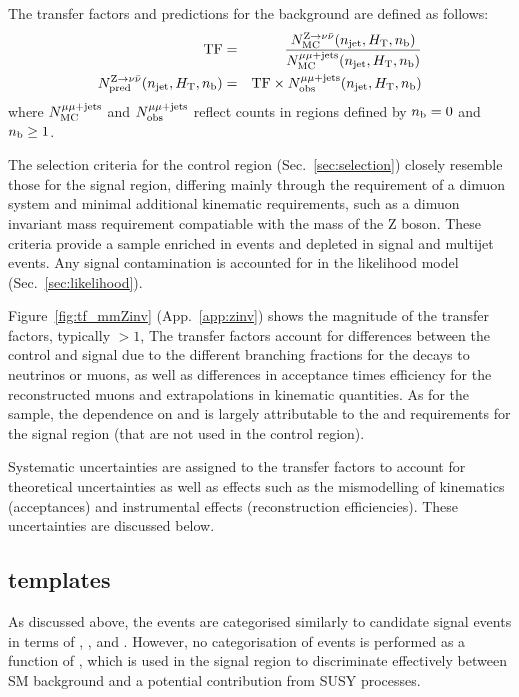 The transfer factors and predictions for the \znunuj background are
defined as follows:
\begin{eqnarray}
  \label{equ:tf-ratio-zinv}
  {\rm TF} & = &   
  \frac{N_{\rm MC}^{{\text Z} \rightarrow \nu\bar{\nu}}(n_{\text{jet}}, \mbox{$H_\text{T}$}, n_{\text{b}})}
  {N_{\rm MC}^{\mu\mu + \textrm{jets}}(n_{\text{jet}}, \mbox{$H_\text{T}$}, n_{\text{b}})} \\
  N_{\textrm{pred}}^{{\text Z} \rightarrow \nu\bar{\nu}}(n_{\text{jet}}, \mbox{$H_\text{T}$}, n_{\text{b}}) & = &
  {\rm TF}
  \times 
  N_{\textrm{obs}}^{\mu\mu + \textrm{jets}}(n_{\text{jet}}, \mbox{$H_\text{T}$}, n_{\text{b}})   
\end{eqnarray}
where $N_{\rm MC}^{\mu\mu + \textrm{jets}}$ and $N_{\textrm{obs}}^{\mu\mu + \textrm{jets}}$ reflect counts in regions
defined by $n_{\text{b}} = 0$ and $n_{\text{b}} \geq 1$.

The selection criteria for the \mmj control region
(Sec.~\ref{sec:selection}) closely resemble those for the signal
region, differing mainly through the requirement of a dimuon system
and minimal additional kinematic requirements, such as a dimuon
invariant mass requirement compatiable with the mass of the Z
boson. These criteria provide a sample enriched in \zmmj events and
depleted in signal and multijet events. Any signal contamination is
accounted for in the likelihood model (Sec.~\ref{sec:likelihood}).

Figure~\ref{fig:tf_mmZinv} (App.~\ref{app:zinv}) shows the magnitude
of the transfer factors, typically $>1$, The transfer factors account
for differences between the \mmj control and signal due to the
different branching fractions for the decays to neutrinos or muons, as
well as differences in acceptance times efficiency for the
reconstructed muons and extrapolations in kinematic quantities. As for
the \mj sample, the dependence on \njet and \scalht is largely
attributable to the \alphat and \bdphi requirements for the signal
region (that are not used in the \mmj control region).

Systematic uncertainties are assigned to the transfer factors to
account for theoretical uncertainties as well as effects such as the
mismodelling of kinematics (\eg acceptances) and instrumental effects
(\eg reconstruction efficiencies). These uncertainties are discussed
below.

\subsection{\texorpdfstring{\mht}{MHT} templates}
\label{sec:mht-zinv-intro}

As discussed above, the \mmj events are categorised similarly to
candidate signal events in terms of \njet, \scalht, and \nb. However,
no categorisation of \mmj events is performed as a function of \mht,
which is used in the signal region to discriminate effectively between
SM background and \eg a potential contribution from SUSY processes.

